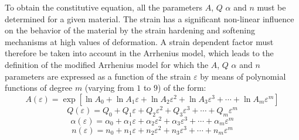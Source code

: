 \documentclass[twoside,english,1p,final,sort&compress]{elsarticle}
\theoremstyle{plain}
\begin{document}
To obtain the constitutive equation, all the parameters $A$, $Q$ $\alpha$ and $n$ must be determined for a given material.
The strain has a significant non-linear influence on the behavior of the material by the strain hardening and softening mechanisms at high values of deformation.
A strain dependent factor must therefore be taken into account in the Arrhenius model, which leads to the definition of the modified Arrhenius model for which the $A$, $Q$ $\alpha$ and $n$ parameters are expressed as a function of the strain $\varepsilon$ by means of polynomial functions of degree $m$ (varying from $1$ to $9$) of the form:
\begin{equation}
A(\varepsilon) = \exp{\left[\ln\!A_0 + \ln\!A_1\varepsilon + \ln\!A_2\varepsilon^2 + \ln\!A_3\varepsilon^3 + \cdots + \ln\!A_m\varepsilon^m\right]}
\label{eq:ArA}
\end{equation}
\begin{equation}
Q(\varepsilon) = Q_0 + Q_1\varepsilon + Q_2\varepsilon^2 + Q_3\varepsilon^3 + \cdots + Q_m\varepsilon^m
\label{eq:ArQ}
\end{equation}
\begin{equation}
\alpha(\varepsilon) = \alpha_0 + \alpha_1\varepsilon + \alpha_2\varepsilon^2 + \alpha_3\varepsilon^3 + \cdots + \alpha_m\varepsilon^m
\label{eq:Aralpha}
\end{equation}
\begin{equation}
n(\varepsilon) = n_0 + n_1\varepsilon + n_2\varepsilon^2 + n_3\varepsilon^3 + \cdots + n_m\varepsilon^m
\label{eq:Arn}
\end{equation}
\end{document}

